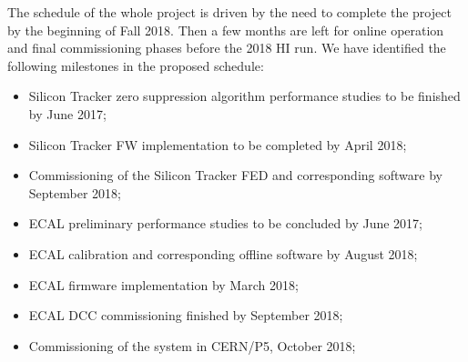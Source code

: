 
The schedule of the whole project is driven by the need to complete the project by the beginning of Fall 2018. Then a few months are left for online operation and final commissioning phases before the 2018 HI run. We have identified the following milestones in the proposed schedule:

\begin{itemize}
\item Silicon Tracker zero suppression algorithm performance studies to be finished by June 2017;
\item Silicon Tracker FW implementation to be completed by April 2018;
\item Commissioning of the Silicon Tracker FED and corresponding software by September 2018;
\item ECAL preliminary performance studies to be concluded by June 2017;
\item ECAL calibration and corresponding offline software by August 2018;
\item ECAL firmware implementation by March 2018;
\item ECAL DCC commissioning finished by September 2018;
\item Commissioning of the system in CERN/P5, October 2018;
\end{itemize}
